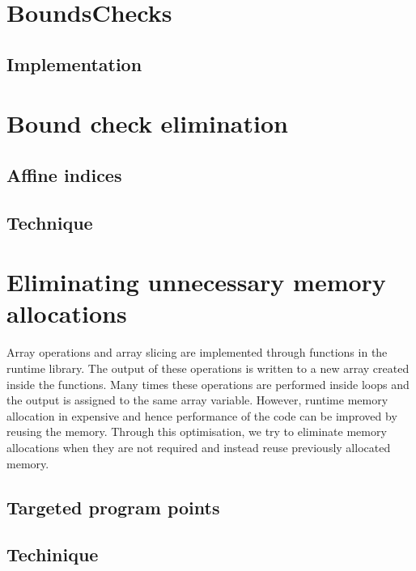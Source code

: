 \section{BoundsChecks}
\subsection{Implementation}
\section{Bound check elimination}
\subsection{Affine indices}
\subsection{Technique}
\section{Eliminating unnecessary memory allocations}
\label{sec:memoptimise}
Array operations and array slicing are implemented through functions in the runtime library. The output of these operations is written to a new array created inside the functions. Many times these operations are performed inside loops and the output is assigned to the same array variable. However, runtime memory allocation in expensive and hence performance of the code can be improved by reusing the memory. Through this optimisation, we try to eliminate memory allocations when they are not required and instead reuse previously allocated memory. 
\subsection{Targeted program points}
\subsection{Techinique}





